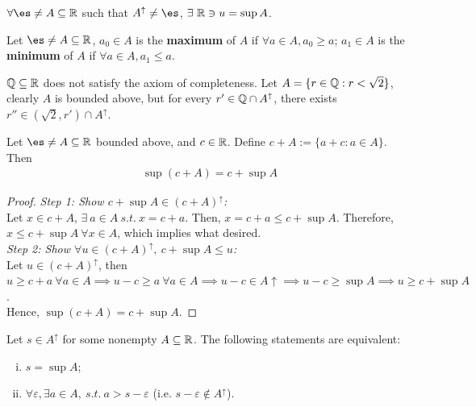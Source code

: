 \documentclass[11pt]{article}
\begin{document}
	\begin{axiom}
		$\forall \es \neq A \subseteq \R$ such that $A^\uparrow \neq \es$, $\exists\ \mathbb{R} \ni u = \sup A$.
	\end{axiom}
	
	\begin{definition}
		Let $\es \neq A \subseteq \R$, $a_0 \in A$ is the \textbf{maximum} of $A$ if $\forall a \in A, a_0 \geq a $; $a_1 \in A$ is the \textbf{minimum} of $A$ if 
		$\forall a \in A, a_1 \leq a$.
	\end{definition}
	
	\begin{example}
		$\mathbb{Q} \subseteq \mathbb{R}$ does not satisfy the axiom of completeness. Let $A = \{r \in \mathbb{Q}: r < \sqrt{2}\}$, clearly $A$ is bounded above, but for every $r' \in \mathbb{Q} \cap A^\uparrow$, there exists $r'' \in (\sqrt{2}, r') \cap A^\uparrow$.
	\end{example}
	
	\begin{proposition}
		Let $\es \neq A \subseteq \R$ bounded above, and $c \in \mathbb{R}$. Define $c + A := \{a + c: a \in A\}$. Then
		\begin{align}
			\sup (c + A) = c + \sup A
		\end{align}
	\end{proposition}
	
	\begin{proof}
		\emph{Step 1: Show $c + \sup A \in (c + A)^\uparrow$:} \\
		Let $x \in c + A$, $\exists\ a \in A\ s.t.\ x = c + a$. Then, $x = c + a \leq c + \sup A$. Therefore, $x \leq c + \sup A\ \forall x \in A$, which implies what desired. \\
		\emph{Step 2: Show $\forall u \in (c + A)^\uparrow,\ c + \sup A \leq u$: }\\
		Let $u \in (c + A)^\uparrow$, then $u \geq c + a\ \forall a \in A \implies u - c \geq a\ \forall a \in A \implies u - c \in A\uparrow \implies u - c \geq \sup A \implies u \geq c + \sup A$. \\
		Hence, $\sup (c + A) = c + \sup A$.
	\end{proof}
	
	\begin{lemma}
		Let $s \in A^\uparrow$ for some nonempty $A \subseteq \mathbb{R}$. The following statements are equivalent:
		\begin{enumerate}[(i)]
			\item $s = \sup A$;
			\item $\forall \varepsilon, \exists a \in A,\ s.t.\ a > s - \varepsilon$ (i.e. $s - \varepsilon \notin A^\uparrow$).
		\end{enumerate}
	\end{lemma}
	
\end{document}
